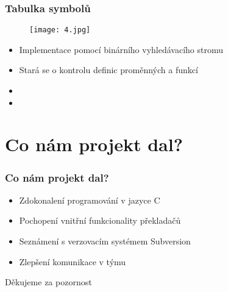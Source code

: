 \documentclass{beamer}
\begin{document}

\begin{frame}
\frametitle{Tabulka symbolů}
    \begin{figure}[!p]
			\texttt{[image: 4.jpg]}
			\end{figure}
		\begin{itemize}
        	\item Implementace pomocí binárního vyhledávacího stromu
        	\item Stará se o kontrolu definic proměnných a funkcí 
        	\item[]
        	\item[]
    	\end{itemize}   		    	    
\end{frame}

\section{Co nám projekt dal?} %

\begin{frame}
\frametitle{Co nám projekt dal?} 
\begin{itemize}
\item Zdokonalení programování v jazyce C
\item Pochopení vnitřní funkcionality překladačů
\item Seznámení s verzovacím systémem Subversion 
\item Zlepšení komunikace v týmu
\end{itemize}
\end{frame}


\begin{frame}
\Huge{\centerline{Děkujeme za pozornost}}
\end{frame}

\end{document}
